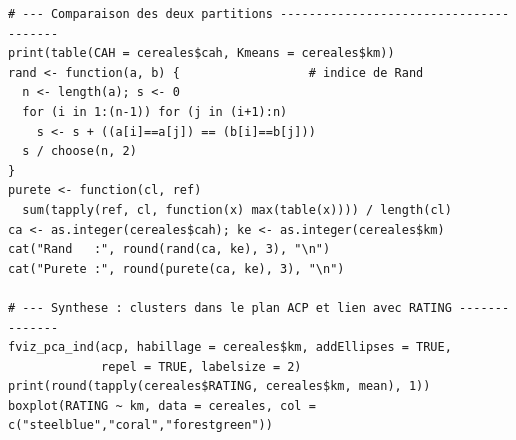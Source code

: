 \documentclass[
]{article}
\begin{document}
{\begin{verbatim}
# --- Comparaison des deux partitions ---------------------------------------
print(table(CAH = cereales$cah, Kmeans = cereales$km))
rand <- function(a, b) {                  # indice de Rand
  n <- length(a); s <- 0
  for (i in 1:(n-1)) for (j in (i+1):n)
    s <- s + ((a[i]==a[j]) == (b[i]==b[j]))
  s / choose(n, 2)
}
purete <- function(cl, ref)
  sum(tapply(ref, cl, function(x) max(table(x)))) / length(cl)
ca <- as.integer(cereales$cah); ke <- as.integer(cereales$km)
cat("Rand   :", round(rand(ca, ke), 3), "\n")
cat("Purete :", round(purete(ca, ke), 3), "\n")

# --- Synthese : clusters dans le plan ACP et lien avec RATING --------------
fviz_pca_ind(acp, habillage = cereales$km, addEllipses = TRUE,
             repel = TRUE, labelsize = 2)
print(round(tapply(cereales$RATING, cereales$km, mean), 1))
boxplot(RATING ~ km, data = cereales, col = c("steelblue","coral","forestgreen"))
\end{verbatim}
}
\end{document}
